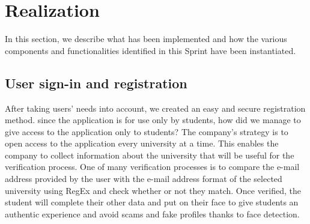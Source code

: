 \section{Realization}
In this section, we describe what has been implemented and how the various components and functionalities identified in this Sprint have been instantiated.

\subsection{User sign-in and registration}
After taking users' needs into account, we created an easy and secure registration method. since the application is for use only by students, how did we manage to give access to the application only to students?
The company's strategy is to open access to the application every university at a time. This enables the company to collect information about the university that will be useful for the verification process. One of many verification processes is to compare the e-mail address provided by the user with the e-mail address format of the selected university using RegEx and check whether or not they match.
Once verified, the student will complete their other data and put on their face to give students an authentic experience and avoid scams and fake profiles thanks to face detection. \\

